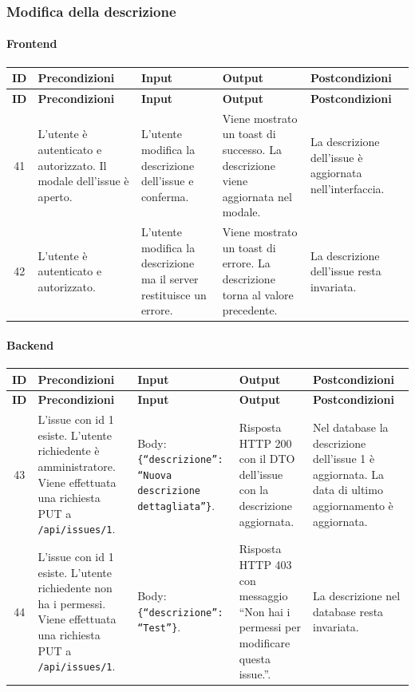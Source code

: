 \subsubsection{Modifica della descrizione}

\paragraph{Frontend}

{
\small
\begin{longtable}{|c|p{3.8cm}|p{3.8cm}|p{3.8cm}|p{3.8cm}|}
\hline
\textbf{ID} & \textbf{Precondizioni} & \textbf{Input} & \textbf{Output} & \textbf{Postcondizioni} \\
\hline
\endfirsthead
\hline
\textbf{ID} & \textbf{Precondizioni} & \textbf{Input} & \textbf{Output} & \textbf{Postcondizioni} \\
\hline
\endhead
41 &
L'utente \`e autenticato e autorizzato. Il modale dell'issue \`e aperto. &
L'utente modifica la descrizione dell'issue e conferma. &
Viene mostrato un toast di successo. La descrizione viene aggiornata nel modale. &
La descrizione dell'issue \`e aggiornata nell'interfaccia. \\
\hline
42 &
L'utente \`e autenticato e autorizzato. &
L'utente modifica la descrizione ma il server restituisce un errore. &
Viene mostrato un toast di errore. La descrizione torna al valore precedente. &
La descrizione dell'issue resta invariata. \\
\hline
\end{longtable}
}

\paragraph{Backend}

{
\small
\begin{longtable}{|c|p{3.8cm}|p{3.8cm}|p{3.8cm}|p{3.8cm}|}
\hline
\textbf{ID} & \textbf{Precondizioni} & \textbf{Input} & \textbf{Output} & \textbf{Postcondizioni} \\
\hline
\endfirsthead
\hline
\textbf{ID} & \textbf{Precondizioni} & \textbf{Input} & \textbf{Output} & \textbf{Postcondizioni} \\
\hline
\endhead
43 &
L'issue con id 1 esiste. L'utente richiedente \`e amministratore. Viene effettuata una richiesta PUT a \texttt{/api/issues/1}. &
Body: \texttt{\{``descrizione'': ``Nuova descrizione dettagliata''\}}. &
Risposta HTTP 200 con il DTO dell'issue con la descrizione aggiornata. &
Nel database la descrizione dell'issue 1 \`e aggiornata. La data di ultimo aggiornamento \`e aggiornata. \\
\hline
44 &
L'issue con id 1 esiste. L'utente richiedente non ha i permessi. Viene effettuata una richiesta PUT a \texttt{/api/issues/1}. &
Body: \texttt{\{``descrizione'': ``Test''\}}. &
Risposta HTTP 403 con messaggio ``Non hai i permessi per modificare questa issue.''. &
La descrizione nel database resta invariata. \\
\hline
\end{longtable}
}


